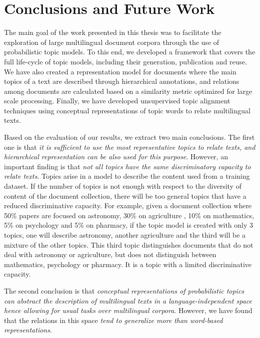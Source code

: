 

\chapter{Conclusions and Future Work}\label{ch:conclusion}

\graphicspath{{conclusions/figures/}}

The main goal of the work presented in this thesis was to facilitate the exploration of large multilingual document corpora through the use of probabilistic topic models. To this end, we developed a framework that covers the full life-cycle of topic models, including their generation, publication and reuse. We have also created a representation model for documents where the main topics of a text are described through hierarchical annotations, and relations among documents are calculated based on a similarity metric optimized for large scale processing. Finally, we have developed unsupervised topic alignment techniques using conceptual representations of topic words to relate multilingual texts. 

Based on the evaluation of our results, we extract two main conclusions. The first one is that \textit{it is sufficient to use the most representative topics to relate texts, and hierarchical representation can be also used for this purpose}. However, an important finding is that \textit{not all topics have the same discriminatory capacity to relate texts}. Topics arise in a model to describe the content used from a training dataset. If the number of topics is not enough with respect to the diversity of content of the document collection, there will be too general topics that have a reduced discriminative capacity. For example, given a document collection where 50\% papers are focused on astronomy, 30\% on agriculture , 10\% on mathematics, 5\% on psychology and 5\% on pharmacy, if the topic model is created with only 3 topics, one will describe astronomy, another agriculture and the third will be a mixture of the other topics. This third topic distinguishes documents that do not deal with astronomy or agriculture, but does not distinguish between mathematics, psychology or pharmacy. It is a topic with a limited discriminative capacity.


The second conclusion is that \textit{conceptual representations of probabilistic topics can abstract the description of multilingual texts in a language-independent space hence allowing for usual tasks over multilingual corpora}. However, we have found that the relations in this space \textit{tend to generalize more than word-based representations}. 

